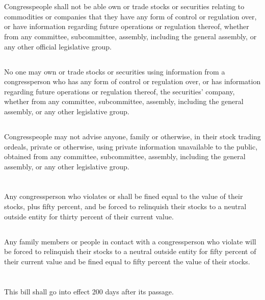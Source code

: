 \documentclass[]{bill}
\begin{document}
	\section{}{
		\subsection{}{
			Congresspeople shall not be able own or trade stocks or securities relating to commodities or companies that they have any form of control or regulation over, or have information regarding future operations or regulation thereof, whether from any committee, subcommittee,  assembly, including the general assembly, or any other official legislative group.
		}
		\subsection{}{
			No one may own or trade stocks or securities using information from a congressperson who has any form of control or regulation over, or has information regarding future operations or regulation thereof, the securities’ company, whether from any committee, subcommittee,  assembly, including the general assembly, or any other legislative group.
		}
		\subsection{}{
			Congresspeople may not advise anyone, family or otherwise, in their stock trading ordeals, private or otherwise, using private information unavailable to the public, obtained from any committee, subcommittee, assembly, including the general assembly, or any other legislative group.
		}
	}
	
	
	\section{}{
		\subsection{}{
			Any congressperson who violates  or  shall be fined equal to the value of their stocks, plus fifty percent, and be forced to relinquish their stocks to a neutral outside entity for thirty percent of their current value.
		}
		\subsection{}{
			Any family members or people in contact with a congressperson who violate  will be forced to relinquish their stocks to a neutral outside entity for fifty percent of their current value and be fined equal to fifty percent the value of their stocks.
		}
	}
	
	
	\section{}{
		\subsection{}{
			This bill shall go into effect 200 days after its passage.
		}
	}
	
\end{document}
